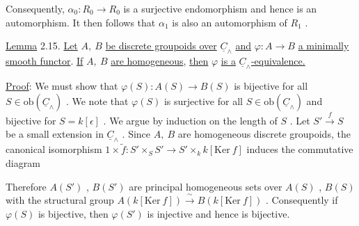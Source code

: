 Consequently, $\alpha_0 : R_0 \to R_0$ is a surjective endomorphism and hence is an automorphism. It then follows that $\alpha_1$ is also an automorphism of $R_1$ .

\underline{Lemma} 2.15.  \underline{Let} $A,\ B$ \underline{be discrete groupoids over} $\underline{C}_\wedge$ \underline{and} $\varphi : A \to B$ \underline{a minimally smooth functor}. \underline{If} $A,\ B$ \underline{are homogeneous}, \underline{then} $\varphi$ \underline{is a} $\underline{C}_\wedge$\underline{-equivalence.}

\underline{Proof}:  We must show that $\varphi(S) : A(S) \longrightarrow B(S)$ is bijective for all $S \in \mathrm{ob}(\underline{C}_\wedge)$ . We note that $\varphi(S)$ is surjective for all $S \in \mathrm{ob}(\underline{C}_\wedge)$ and bijective for $S = k[\epsilon]$ . We argue by induction on the length of $S$ . Let $S' \overset{f}{\longrightarrow} S$ be a small extension in $\underline{C}_\wedge$ . Since $A,\ B$ are homogeneous discrete groupoids, the canonical isomorphism $1 \times \tilde{f} : S' \times_S S' \longrightarrow S' \times_k k[\mathrm{Ker}\ f]$ induces the commutative diagram
Therefore  $A(S')$ , $B(S')$  are principal homogeneous sets over  $A(S)$ , $B(S)$  with the structural group  $A(k[\mathrm{Ker}\ f]) \xrightarrow{\ \sim\ } B(k[\mathrm{Ker}\ f])$  . Consequently if  $\varphi(S)$  is bijective, then  $\varphi(S')$  is injective and hence is bijective.

